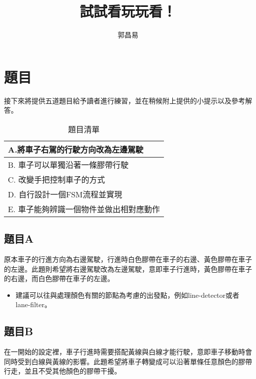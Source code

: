 \documentclass{article}
\title{試試看玩玩看！}
\author{郭昌易}
\date{} %
\begin{document}
\maketitle

\section{題目}

接下來將提供五道題目給予讀者進行練習，並在稍候附上提供的小提示以及參考解答。

\begin{table}[h]
\caption{題目清單}

\begin{center}
\begin{tabular}{||l||}
\hline
A.將車子右駕的行駛方向改為左邊駕駛\\
\hline
B. 車子可以單獨沿著一條膠帶行駛\\
\hline
C. 改變手把控制車子的方式\\
\hline
D. 自行設計一個FSM流程並實現\\
\hline
E. 車子能夠辨識一個物件並做出相對應動作\\
\hline
\end{tabular}
\end{center}
\end{table}

\subsection{題目A}

原本車子的行進方向為右邊駕駛，行進時白色膠帶在車子的右邊、黃色膠帶在車子的左邊。此題則希望將右邊駕駛改為左邊駕駛，意即車子行進時，黃色膠帶在車子的右邊，而白色膠帶在車子的左邊。

\begin{itemize}

\item 建議可以往與處理顏色有關的節點為考慮的出發點，例如line-detector或者lane-filter。

\end{itemize}

\subsection{題目B}

在一開始的設定裡，車子行進時需要搭配黃線與白線才能行駛，意即車子移動時會同時受到白線與黃線的影響。此題希望將車子轉變成可以沿著單條任意顏色的膠帶行走，並且不受其他顏色的膠帶干擾。
\end{document}
